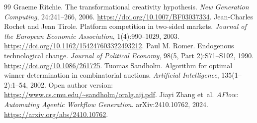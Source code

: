 \documentclass[11pt,letterpaper]{article}
\theoremstyle{remark}\newtheorem{remark}{Remark}[section]
\begin{document}
\begin{thebibliography}{99}
Graeme Ritchie. The transformational creativity hypothesis. \emph{New Generation Computing}, 24:241--266, 2006. \url{https://doi.org/10.1007/BF03037334}.
Jean-Charles Rochet and Jean Tirole. Platform competition in two-sided markets. \emph{Journal of the European Economic Association}, 1(4):990--1029, 2003. \url{https://doi.org/10.1162/154247603322493212}.
Paul M. Romer. Endogenous technological change. \emph{Journal of Political Economy}, 98(5, Part 2):S71--S102, 1990. \url{https://doi.org/10.1086/261725}.
Tuomas Sandholm. Algorithm for optimal winner determination in combinatorial auctions. \emph{Artificial Intelligence}, 135(1--2):1--54, 2002. Open author version: \url{https://www.cs.cmu.edu/~sandholm/oralg.aij.pdf}.
Jiayi Zhang et~al. \emph{AFlow: Automating Agentic Workflow Generation}. arXiv:2410.10762, 2024. \url{https://arxiv.org/abs/2410.10762}.
\end{thebibliography}
\end{document}
